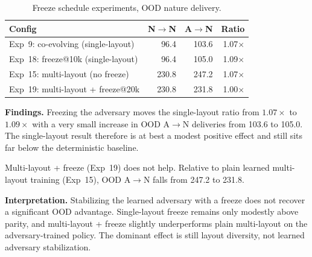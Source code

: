 \documentclass[sigconf]{aamas}
\begin{document}
\begin{table}[H]
\caption{Freeze schedule experiments, OOD nature delivery.}
\label{tab:freeze}
\centering
\footnotesize
\begin{tabular}{lrrr}
\toprule
\textbf{Config} & \textbf{N$\to$N} & \textbf{A$\to$N} & \textbf{Ratio} \\
\midrule
Exp~9: co-evolving (single-layout)   & 96.4  & 103.6  & 1.07$\times$ \\
Exp~18: freeze@10k (single-layout)  & 96.4  & 105.0  & 1.09$\times$ \\
Exp~15: multi-layout (no freeze)    & 230.8 & 247.2 & 1.07$\times$ \\
Exp~19: multi-layout + freeze@20k   & 230.8 & 231.8 & 1.00$\times$ \\
\bottomrule
\end{tabular}
\end{table}

\textbf{Findings.} Freezing the adversary moves the single-layout ratio from
$1.07\times$ to $1.09\times$ with a very small increase in OOD
A$\to$N deliveries from 103.6 to 105.0. The single-layout result therefore
is at best a modest positive effect and still sits far below the deterministic
baseline.

Multi-layout + freeze (Exp~19) does not help. Relative to plain learned
multi-layout training (Exp~15), OOD A$\to$N falls from 247.2 to 231.8.

\textbf{Interpretation.} Stabilizing the learned adversary with a freeze does not
recover a significant OOD advantage. Single-layout freeze remains only
modestly above parity, and multi-layout + freeze slightly underperforms plain multi-layout on
the adversary-trained policy. The dominant effect is still layout diversity, not
learned adversary stabilization.

\end{document}

